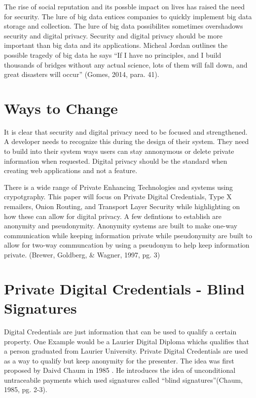 \documentclass[12pt]{article}
\begin{document}
The rise of social reputation and its possble impact on lives has raised the need for security. The lure of big data entices companies to quickly implement big data storage and collection. The lure of big data possibilites sometimes overshadows security and digital privacy. Security and digital privacy should be more important than big data and its applications. Micheal Jordan outlines the possible tragedy of big data he says ``If I have no principles, and I build thousands of bridges without any actual science, lots of them will fall down, and great disasters will occur'' (Gomes, 2014, para. 41).

\section{Ways to  Change}\label{sec:developers}
It is clear that security and digital privacy need to be focused and strengthened. A developer needs to recognize this during the design of their system. They need to build into their system ways users can stay annonymous or delete private information when requested. Digital privacy should be the standard when creating web applications and not a feature.

There is a wide range of Private Enhancing Technologies and systems using crypotgraphy. This paper will focus on Private Digital Credentials, Type X remailers, Onion Routing, and Transport Layer Security while highlighting on how these can allow for digital privacy. A few defintions to establish are anonymity and pseudonymity. Anonymity systems are built to make one-way communication while keeping information private while pseudonymity are built to allow for two-way communcation by using a pseudonym to help keep information private. (Brewer, Goldberg, \& Wagner, 1997, pg. 3)

\section{Private Digital Credentials - Blind Signatures}\label{sec:PDC}
Digital Credentials are just information that can be used to qualify a certain property. One Example would be a Laurier Digital Diploma whichs qualifies that a person graduated from Laurier University.  Private Digital Credentials are used as a way to qualify but keep anonymity for the presenter. The idea was first proposed by Daivd Chaum in 1985 . He introduces the idea of unconditional untraceabile payments which used signatures called ``blind signatures''(Chaum, 1985, pg. 2-3). 
\end{document}
